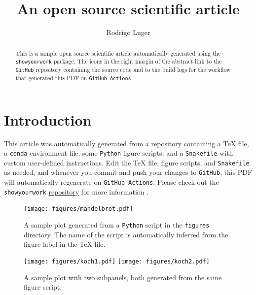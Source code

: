 \documentclass[twocolumn]{aastex631}
\begin{document}
\title{An open source scientific article}

\author{Rodrigo Luger}

\begin{abstract}
    This is a sample open source scientific article automatically generated using the \texttt{showyourwork} package.
    The icons in the right margin of the abstract link to the \texttt{GitHub} repository containing the source code and to the build logs for the workflow that generated this PDF on \texttt{GitHub Actions}.
\end{abstract}

\section{Introduction}
This article was automatically generated from a repository containing a TeX file,
a \texttt{conda} environment file, some \texttt{Python} figure scripts, and a \texttt{Snakefile} with custom user-defined instructions.
Edit the TeX file, figure scripts, and \texttt{Snakefile} as needed, and whenever you commit and push your changes to \texttt{GitHub}, this PDF will automatically regenerate on \texttt{GitHub Actions}. Please check out the \texttt{showyourwork} \href{https://github.com/rodluger/showyourwork}{repository} for more information \citep{Luger2021}.

\begin{figure}[ht!]
    \begin{centering}
        \texttt{[image: figures/mandelbrot.pdf]}
        \caption{
            A sample plot generated from a \texttt{Python} script in the \texttt{figures} directory.
            The name of the script is automatically inferred from the figure label in the TeX file.
        }
        \label{fig:mandelbrot}
    \end{centering}
\end{figure}

\begin{figure}[ht!]
    \begin{centering}
        \texttt{[image: figures/koch1.pdf]}
        \texttt{[image: figures/koch2.pdf]}
        \caption{
            A sample plot with two subpanels, both generated from the same figure script.
        }
        \label{fig:koch}
    \end{centering}
\end{figure}
\end{document}
